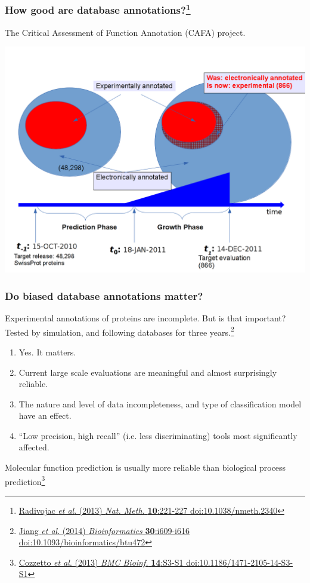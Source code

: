 \begin{frame}
  \frametitle{How good are database annotations?\footnote{\tiny{\href{http://dx.doi.org/10.1038/nmeth.2340}{Radivojac \textit{et al}. (2013) \textit{Nat. Meth.} \textbf{10}:221-227 doi:10.1038/nmeth.2340}}}}
  The Critical Assessment of Function Annotation (CAFA) project.
  \begin{center}
    \includegraphics[height=0.7\textheight]{images/cafa_annotation_problem}
  \end{center}   
\end{frame}

\begin{frame}
  \frametitle{Do biased database annotations matter?}
  Experimental annotations of proteins are incomplete. But is that important?\\
  Tested by simulation, and following databases for three years.\footnote{\tiny{\href{http://dx.doi.org/10.1093/bioinformatics/btu472}{Jiang \textit{et al}. (2014) \textit{Bioinformatics} \textbf{30}:i609-i616 doi:10.1093/bioinformatics/btu472}}}
  \begin{enumerate}
    \item Yes. It matters.
    \item Current large scale evaluations are meaningful and almost surprisingly reliable.
    \item The nature and level of data incompleteness, and type of classification model have an effect.
    \item ``Low precision, high recall'' (i.e. less discriminating) tools most significantly affected.
  \end{enumerate}
  Molecular function prediction is usually more reliable than biological process prediction\footnote{\tiny{\href{http://dx.doi.org/10.1186/1471-2105-14-S3-S1}{Cozzetto \textit{et al}. (2013) \textit{BMC Bioinf.} \textbf{14}:S3-S1 doi:10.1186/1471-2105-14-S3-S1}}}
\end{frame}

